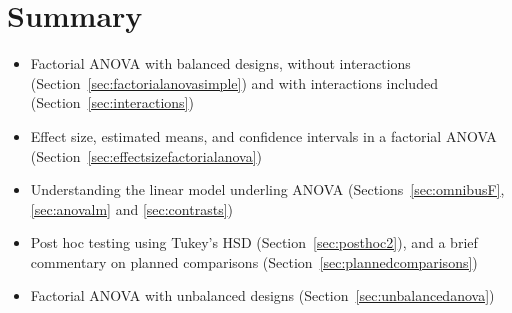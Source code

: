 \section{Summary}

\begin{itemize} \itemsep -2pt
\item Factorial ANOVA with balanced designs, without interactions (Section~\ref{sec:factorialanovasimple}) and with interactions included (Section~\ref{sec:interactions})
\item Effect size, estimated means, and confidence intervals in a factorial ANOVA (Section~\ref{sec:effectsizefactorialanova})
\item Understanding the linear model underling ANOVA  (Sections~\ref{sec:omnibusF}, \ref{sec:anovalm} and \ref{sec:contrasts})
\item Post hoc testing using Tukey's HSD (Section~\ref{sec:posthoc2}), and a brief commentary on planned comparisons (Section~\ref{sec:plannedcomparisons})
\item Factorial ANOVA with unbalanced designs (Section~\ref{sec:unbalancedanova})
\end{itemize}


